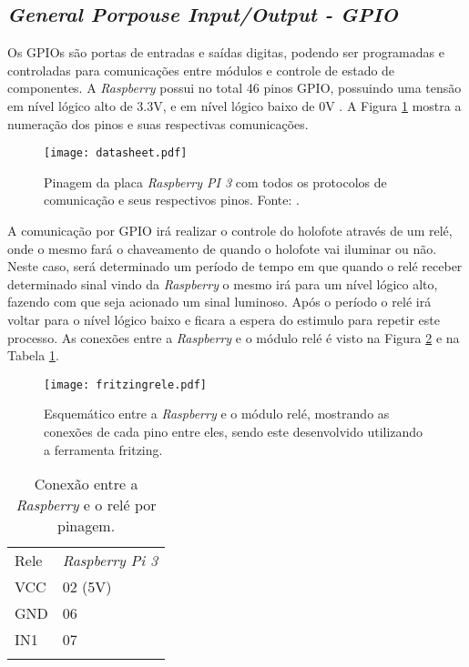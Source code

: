 \subsection{\emph{General Porpouse Input/Output - GPIO}}
Os GPIOs são portas de entradas e saídas digitas, podendo ser programadas e controladas para comunicações entre módulos e controle de estado de componentes. A \emph{Raspberry} possui no total 46 pinos GPIO, possuindo uma tensão em nível lógico alto de 3.3V, e em nível lógico baixo de 0V \cite{gpio1}. A Figura \ref{datasheet} mostra a numeração dos pinos e suas respectivas comunicações.
\begin{figure}[H]
    \centering
    \texttt{[image: datasheet.pdf]}
    \caption {Pinagem da placa \emph{Raspberry PI 3} com todos os protocolos de comunicação e seus respectivos pinos. Fonte: \cite{gpio}.}
    \label{datasheet}
\end{figure}
A comunicação por GPIO irá realizar o controle do holofote através de um relé, onde o mesmo fará o chaveamento de quando o holofote vai iluminar ou não. Neste caso, será determinado um período de tempo em que quando o relé receber determinado sinal vindo da \emph{Raspberry} o mesmo irá para um nível lógico alto, fazendo com que seja acionado um sinal luminoso. Após o período o relé irá voltar para o nível lógico baixo e ficara a espera do estimulo para repetir este processo.  As conexões entre a \emph{Raspberry} e o módulo relé é visto na Figura \ref{fritizingrele} e na Tabela \ref{tabelarele}.
    \begin{figure}[H]
    \centering
    \texttt{[image: fritzingrele.pdf]}
    \caption{Esquemático entre a \emph{Raspberry} e o módulo relé, mostrando as conexões de cada pino entre eles, sendo este desenvolvido utilizando a ferramenta fritzing.}
    \label{fritizingrele}
\end{figure}
  \begin{table}[h]
 \centering
 {\renewcommand\arraystretch{1.25}
 \caption{Conexão entre a \emph{Raspberry} e o relé por pinagem.}
 \begin{tabular}{ l l }
  \cline{1-1}\cline{2-2}  
    \multicolumn{1}{|p{3.850cm}|}{Rele \centering } &
    \multicolumn{1}{p{4.217cm}|}{\emph{Raspberry Pi 3} \centering }
  \\  
  \cline{1-1}\cline{2-2}  
    \multicolumn{1}{|p{3.850cm}|}{VCC \centering } &
    \multicolumn{1}{p{4.217cm}|}{02 (5V) \centering }
  \\  
  \cline{1-1}\cline{2-2}  
    \multicolumn{1}{|p{3.850cm}|}{GND \centering } &
    \multicolumn{1}{p{4.217cm}|}{06  \centering }
  \\  
  \cline{1-1}\cline{2-2}  
    \multicolumn{1}{|p{3.850cm}|}{IN1 \centering } &
    \multicolumn{1}{p{4.217cm}|}{07 \centering }
  \\  
   \hline
\label{tabelarele}
 \end{tabular} }
\end{table}  
